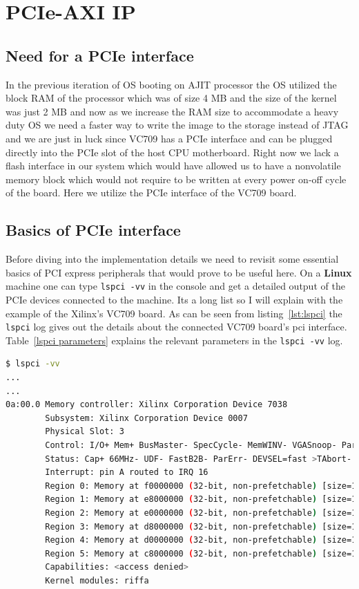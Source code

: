 \section{PCIe-AXI IP}

\subsection{Need for a PCIe interface}

In the previous iteration of OS booting on AJIT processor the OS utilized the block RAM of the processor which was of size 4 MB
and the size of the kernel was just 2 MB and now as we increase the RAM size to accommodate a heavy duty OS we need a faster way to write
the image to the storage instead of JTAG and we are just in luck since VC709 has a PCIe interface and can be plugged directly into the PCIe
slot of the host CPU motherboard.  Right now we lack a flash interface in our system which would have allowed us to have a nonvolatile
memory block which would not require to be written at every power on-off cycle of the board. Here we utilize the PCIe interface of the
VC709 board.

\subsection{Basics of PCIe interface}

Before diving into the implementation details we need to revisit some essential basics of PCI express peripherals that would prove to be
useful here.  On a \textbf{Linux} machine one can type \verb|lspci -vv| in the console and get a detailed output of the PCIe devices
connected to the machine. Its a long list so I will explain with the example of the Xilinx's VC709 board. As can be seen from
listing~\ref{lst:lspci} the \verb|lspci| log gives out the details about the connected VC709 board's pci interface. Table~\ref{lspci
parameters} explains the relevant parameters in the \verb|lspci -vv| log.

\singlespacing
\scriptsize{
\begin{lstlisting}[language=bash, caption=lspci log,label={lst:lspci}, emph={Region, lspci, vv, 0a:00\.0}]
$ lspci -vv
...
...
0a:00.0 Memory controller: Xilinx Corporation Device 7038 
        Subsystem: Xilinx Corporation Device 0007 
        Physical Slot: 3 
        Control: I/O+ Mem+ BusMaster- SpecCycle- MemWINV- VGASnoop- ParErr+ Steppi......
        Status: Cap+ 66MHz- UDF- FastB2B- ParErr- DEVSEL=fast >TAbort- <TAbort- <M......
        Interrupt: pin A routed to IRQ 16 
        Region 0: Memory at f0000000 (32-bit, non-prefetchable) [size=128M] 
        Region 1: Memory at e8000000 (32-bit, non-prefetchable) [size=128M] 
        Region 2: Memory at e0000000 (32-bit, non-prefetchable) [size=128M] 
        Region 3: Memory at d8000000 (32-bit, non-prefetchable) [size=128M] 
        Region 4: Memory at d0000000 (32-bit, non-prefetchable) [size=128M] 
        Region 5: Memory at c8000000 (32-bit, non-prefetchable) [size=128M] 
        Capabilities: <access denied> 
        Kernel modules: riffa
\end{lstlisting}
}

